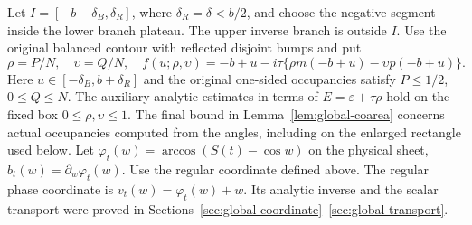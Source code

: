 \documentclass[11pt]{article}
\numberwithin{equation}{section}
\theoremstyle{remark}\newtheorem{remark}[theorem]{Remark}
\begin{document}
Let $I=[-b-\delta_B,\delta_R]$, where $\delta_R=\delta<b/2$,
and choose the negative segment inside the lower branch plateau.
The upper inverse branch is outside $I$.  Use the original balanced
contour with reflected disjoint bumps and put
\[
 \rho=P/N,\quad\upsilon=Q/N,\quad
 f(u;\rho,\upsilon)
 =-b+u-i\tau\{\rho m(-b+u)-\upsilon p(-b+u)\}.
\]
Here $u\in[-\delta_B,b+\delta_R]$ and the original one-sided
occupancies satisfy $P\le1/2$, $0\le Q\le N$.
The auxiliary analytic estimates in terms of $E=\varepsilon+\tau\rho$
hold on the fixed box $0\le\rho,\upsilon\le1$.
The final bound in Lemma~\ref{lem:global-coarea} concerns actual
occupancies computed from the angles, including on the enlarged
rectangle used below.
Let $\varphi_t(w)=\arccos(S(t)-\cos w)$ on the physical sheet,
$b_t(w)=\partial_w\varphi_t(w)$. Use the regular coordinate
defined above.
The regular phase coordinate is
$v_t(w)=\varphi_t(w)+w$.
Its analytic inverse and the scalar transport were proved in
Sections~\ref{sec:global-coordinate}--\ref{sec:global-transport}.
\end{document}
